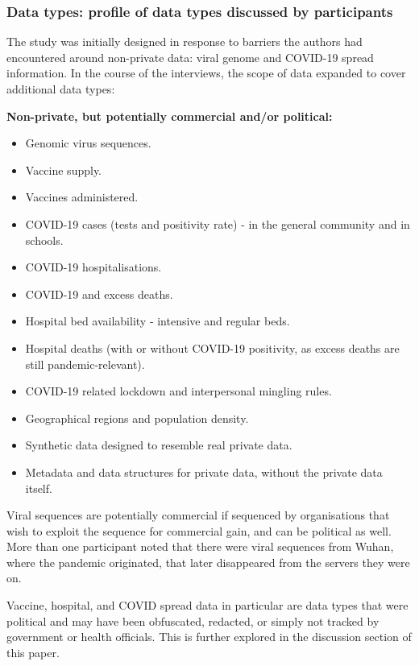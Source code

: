 \documentclass{CUP-JNL-DAP}%
\begin{document}
\subsubsection{Data types: profile of data types discussed by participants}
The study was initially designed in response to barriers the authors had encountered around non-private data: viral genome and COVID-19 spread information. In the course of the interviews, the scope of data expanded to cover additional data types: 

\textbf{Non-private, but potentially commercial and/or political:}
\begin{itemize}
\item Genomic virus sequences.
\item Vaccine supply.
\item Vaccines administered.
\item COVID-19 cases (tests and positivity rate) - in the general community and in schools.
\item COVID-19 hospitalisations.
\item COVID-19 and excess deaths.
\item Hospital bed availability - intensive and regular beds.
\item Hospital deaths (with or without COVID-19 positivity, as excess deaths are still pandemic-relevant).
\item COVID-19 related lockdown and interpersonal mingling rules.
\item Geographical regions and population density.
\item Synthetic data designed to resemble real private data.
\item Metadata and data structures for private data, without the private data itself. 
\end{itemize}

Viral sequences are potentially commercial if sequenced by organisations that wish to exploit the sequence for commercial gain, and can be political as well. More than one participant noted that there were viral sequences from Wuhan, where the pandemic originated, that later disappeared from the servers they were on. 

Vaccine, hospital, and COVID spread data in particular are data types that were political and may have been obfuscated, redacted, or simply not tracked by government or health officials. This is further explored in the discussion section of this paper.
\end{document}
